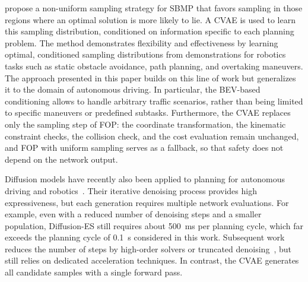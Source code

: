 \textcite{Ichter2018SamplingDistributions} propose a non-uniform sampling strategy for SBMP that favors sampling in those regions where an optimal solution is more likely to lie. A CVAE is used to learn this sampling distribution, conditioned on information specific to each planning problem. The method demonstrates flexibility and effectiveness by learning optimal, conditioned sampling distributions from demonstrations for robotics tasks such as static obstacle avoidance, path planning, and overtaking maneuvers.
The approach presented in this paper builds on this line of work but generalizes it to the domain of autonomous driving. In particular, the BEV-based conditioning allows to handle arbitrary traffic scenarios, rather than being limited to specific maneuvers or predefined subtasks.
Furthermore, the CVAE replaces only the sampling step of FOP: the coordinate transformation, the kinematic constraint checks, the collision check, and the cost evaluation remain unchanged, and FOP with uniform sampling serves as a fallback, so that safety does not depend on the network output.

Diffusion models have recently also been applied to planning for autonomous driving and robotics~\cite{Yang2024DiffusionES, Liao2025DiffusionDrive}. Their iterative denoising process provides high expressiveness, but each generation requires multiple network evaluations.
For example, even with a reduced number of denoising steps and a smaller population, Diffusion-ES still requires about 500~ms per planning cycle, which far exceeds the planning cycle of 0.1~s considered in this work.
Subsequent work reduces the number of steps by high-order solvers or truncated denoising~\cite{Liao2025DiffusionDrive}, but still relies on dedicated acceleration techniques.
In contrast, the CVAE generates all candidate samples with a single forward pass.

